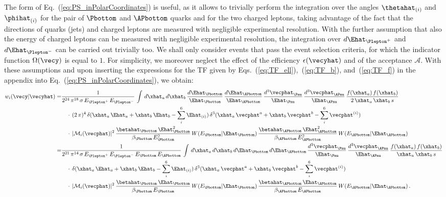 The form of Eq.~(\ref{eq:PS_inPolarCoordinates}) is useful, 
as it allows to trivially perform the integration over the 
angles $\thetahat_{(i)}$ and $\phihat_{(i)}$ for the pair of $\Pbottom$ and $\APbottom$ quarks and for the two charged leptons,
taking advantage of the fact that the directions of quarks (jets) and charged leptons are measured with negligible experimental resolution.
With the further assumption that also the energy of charged leptons can be measured with negligible experimental resolution,
the integration over $d\Ehat_{\Plepton^{+}}$ and $d\Ehat_{\Plepton^{-}}$ can be carried out trivially too.
We shall only consider events that pass the event selection criteria, \ie for which the indicator function $\Omega(\vecy)$ is equal to $1$.
For simplicity, we moreover neglect the effect of the efficiency $\epsilon(\vecyhat)$ and of the acceptance $\mathcal{A}$.
With these assumptions and upon inserting the expressions for the TF given by Eqs.~(\ref{eq:TF_ell}),~(\ref{eq:TF_b}), and~(\ref{eq:TF_f}) in the appendix
into Eq.~(\ref{eq:PS_inPolarCoordinates}), we obtain:
\begin{align}
w_{i}(\vecy|\vecyhat) 
 = & \frac{1}{2^{24} \, \pi^{18} \, \sigma \, E_{\Plepton^{+}} \, E_{\Plepton^{-}}} \, \int \, d\xhat_{a} \, d\xhat_{b} \,
\frac{d\Ehat_{\Pbottom}}{\Ehat_{\Pbottom}} \, \frac{d\Ehat_{\APbottom}}{\Ehat_{\APbottom}} \, \frac{d^{3}\vecphat_{\Pnu}}{\Ehat_{\Pnu}} \, \frac{d^{3}\vecphat_{\APnu}}{\Ehat_{\APnu}} \,
\frac{f(\xhat_{a}) \, f(\xhat_{b})}{2 \, \xhat_{a} \, \xhat_{b} \, s} \nonumber \\
 & \quad \cdot \, (2 \, \pi)^{4} \, \delta( \xhat_{a} \, \Ehat_{a} + \xhat_{b} \, \Ehat_{b} - \sum_{i}^{6} \Ehat_{(i)}) \, 
\delta^{3}( \xhat_{a} \, \vecphat^{a} + \xhat_{b} \, \vecphat^{b} - \sum_{i}^{6} \vecphat^{(i)}) \nonumber \\
 & \quad \cdot \, \vert \mathcal{M}_{i}(\vecphat) \vert^{2} \, \frac{\betahat_{\Pbottom} \, \Ehat_{\Pbottom}^{2}}{\beta_{\Pbottom} \, E_{\Pbottom}^{2}} \, W(E_{\Pbottom}|\Ehat_{\Pbottom}) \, 
\frac{\betahat_{\APbottom} \, \Ehat_{\APbottom}^{2}}{\beta_{\APbottom} \, E_{\APbottom}^{2}} \, W(E_{\APbottom}|\Ehat_{\APbottom}) \nonumber \\
 = & \frac{1}{2^{21} \, \pi^{14} \, \sigma \, E_{\Plepton^{+}} \, E_{\Plepton^{-}} \, E_{\Pbottom} \, E_{\APbottom}} \, \int \, d\xhat_{a} \, d\xhat_{b} \,
d\Ehat_{\Pbottom} \, d\Ehat_{\APbottom} \, \frac{d^{3}\vecphat_{\Pnu}}{\Ehat_{\Pnu}} \, \frac{d^{3}\vecphat_{\APnu}}{\Ehat_{\APnu}} \,
\frac{f(\xhat_{a}) \, f(\xhat_{b})}{\xhat_{a} \, \xhat_{b} \, s} \nonumber \\
 & \quad \cdot \, \delta( \xhat_{a} \, \Ehat_{a} + \xhat_{b} \, \Ehat_{b} - \sum_{i}^{6} \Ehat_{(i)}) \,
\delta^{3}( \xhat_{a} \, \vecphat^{a} + \xhat_{b} \, \vecphat^{b} - \sum_{i}^{6} \vecphat^{(i)}) \nonumber \\
 & \quad \cdot \, \vert \mathcal{M}_{i}(\vecphat) \vert^{2}\, \frac{\betahat_{\Pbottom} \, \Ehat_{\Pbottom}}{\beta_{\Pbottom} \, E_{\Pbottom}} \, W(E_{\Pbottom}|\Ehat_{\Pbottom}) \, 
\frac{\betahat_{\APbottom} \, \Ehat_{\APbottom}}{\beta_{\APbottom} \, E_{\APbottom}} \, W(E_{\APbottom}|\Ehat_{\APbottom}) \, .
\label{eq:mem2}
\end{align}
